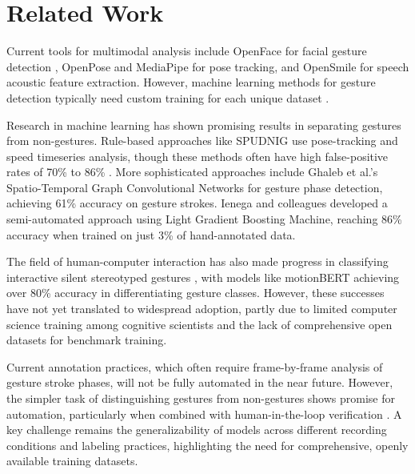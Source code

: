 \documentclass[12pt,a4paper]{article}
\begin{document}
\section{Related Work}
Current tools for multimodal analysis include OpenFace for facial gesture detection \citep{baltrusaitisOpenFaceOpenSource2016}, OpenPose \citep{caoOpenPoseRealtimeMultiPerson2021} and MediaPipe \citep{caoOpenPoseRealtimeMultiPerson2021} for pose tracking, and OpenSmile \citep{eybenOpensmileMunichVersatile2010} for speech acoustic feature extraction. However, machine learning methods for gesture detection typically need custom training for each unique dataset \citep{gregoriRoadmapTechnologicalInnovation2023, henleinOutlookAIInnovation2024}.

Research in machine learning has shown promising results in separating gestures from non-gestures. Rule-based approaches like SPUDNIG \citep{ripperdaSpeedingDetectionNoniconic2020} use pose-tracking and speed timeseries analysis, though these methods often have high false-positive rates of 70\% \citep{ripperdaSpeedingDetectionNoniconic2020} to 86\% \citep{pouwSemanticallyRelatedGestures2021}. More sophisticated approaches include Ghaleb et al.'s \citep{ghalebCoSpeechGestureDetection2024} Spatio-Temporal Graph Convolutional Networks for gesture phase detection, achieving 61\% accuracy on gesture strokes. Ienega and colleagues \citep{ienagaSemiautomationGestureAnnotation2022} developed a semi-automated approach using Light Gradient Boosting Machine, reaching 86\% accuracy when trained on just 3\% of hand-annotated data.

The field of human-computer interaction has also made progress in classifying interactive silent stereotyped gestures \citep{molchanovOnlineDetectionClassification2016, frontedduDynamicHandGesture2022}, with models like motionBERT \citep{zhuMotionBERTUnifiedPerspective2023} achieving over 80\% accuracy in differentiating gesture classes. However, these successes have not yet translated to widespread adoption, partly due to limited computer science training among cognitive scientists \cite{sieversDeepSocialNeuroscience2024} and the lack of comprehensive open datasets for benchmark training.

Current annotation practices, which often require frame-by-frame analysis of gesture stroke phases, will not be fully automated in the near future. However, the simpler task of distinguishing gestures from non-gestures shows promise for automation, particularly when combined with human-in-the-loop verification \citep{ripperdaSpeedingDetectionNoniconic2020}. A key challenge remains the generalizability of models across different recording conditions and labeling practices, highlighting the need for comprehensive, openly available training datasets.
\end{document}
